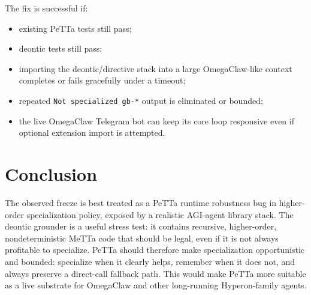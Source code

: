 \documentclass[11pt]{article}
\begin{document}
The fix is successful if:

\begin{itemize}[nosep]
\item existing PeTTa tests still pass;
\item deontic tests still pass;
\item importing the deontic/directive stack into a large OmegaClaw-like context completes or fails gracefully under a timeout;
\item repeated \texttt{Not specialized gb-*} output is eliminated or bounded;
\item the live OmegaClaw Telegram bot can keep its core loop responsive even if optional extension import is attempted.
\end{itemize}

\section{Conclusion}

The observed freeze is best treated as a PeTTa runtime robustness bug in higher-order specialization policy, exposed by a realistic AGI-agent library stack. The deontic grounder is a useful stress test: it contains recursive, higher-order, nondeterministic MeTTa code that should be legal, even if it is not always profitable to specialize. PeTTa should therefore make specialization opportunistic and bounded: specialize when it clearly helps, remember when it does not, and always preserve a direct-call fallback path. This would make PeTTa more suitable as a live substrate for OmegaClaw and other long-running Hyperon-family agents.
\end{document}
